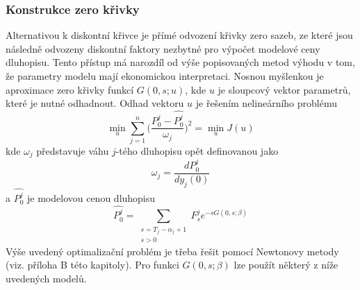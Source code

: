 \documentclass[a4paper]{book}
\begin{document}
\subsubsection{Konstrukce zero křivky}

Alternativou k diskontní křivce je přímé odvození křivky zero sazeb, ze které jsou následně odvozeny diskontní faktory nezbytné pro výpočet modelové ceny dluhopisu. Tento přístup má narozdíl od výše popisovaných metod výhodu v tom, že parametry modelu mají ekonomickou interpretaci. Nosnou myšlenkou je aproximace zero křivky funkcí $G(0,s;u)$, kde $u$ je sloupcový vektor parametrů, které je nutné odhadnout. Odhad vektoru $u$ je řešením nelineárního problému
\begin{equation*}
\underset{u}{\min} \sum_{j=1}^n \Bigg( \frac{P_0^j - \hat{P_0^j}}{\omega_j}\Bigg)^2 = \underset{u}{\min} J(u)
\end{equation*}
kde $\omega_j$ představuje váhu $j$-tého dluhopisu opět definovanou jako
\begin{equation*}
\omega_j = \frac{d P_0^j}{dy_j(0)}
\end{equation*}
a $\hat{P_0^j}$ je modelovou cenou dluhopisu
\begin{equation*}
\hat{P_0^j} = \sum_{\substack{s=T_j-\alpha_j+1 \\ s > 0}} F_s^j e^{-sG(0,s;\beta)}
\end{equation*}
Výše uvedený optimalizační problém je třeba řešit pomocí Newtonovy metody (viz. příloha B této kapitoly). Pro funkci $G(0,s;\beta)$ lze použít některý z níže uvedených modelů.\\
\end{document}
